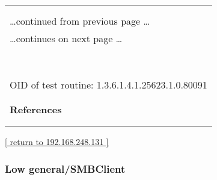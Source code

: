 \documentclass{article}
\begin{document}
\begin{longtable}{|p{}|}
\hline
\rowcolor{openvas_warning}{\color{white}{Medium (CVSS: 2.6) }}\\
\rowcolor{openvas_warning}{\color{white}{NVT: TCP timestamps}}\\
\hline
\endfirsthead
\hfill\ldots continued from previous page \ldots \\
\hline
\endhead
\hline
\ldots continues on next page \ldots \\
\endfoot
\hline
\endlastfoot
\\
\rowcolor{white}{\verb=It was detected that the host implements RFC1323.=}\\
\rowcolor{white}{\verb=The following timestamps were retrieved with a delay of 1 seconds in-between:=}\\
\rowcolor{white}{\verb=Paket 1: 831744=}\\
\rowcolor{white}{\verb=Paket 2: 831845=}\\
\rowcolor{white}{\verb==}\\
\rowcolor{white}{\verb==}\\
\\
OID of test routine: 1.3.6.1.4.1.25623.1.0.80091\\
\\

      \hline
      \\
\textbf{References}\\
\rowcolor{white}{\verb=Other:=}\\
\rowcolor{white}{\verb=  URL:http://www.ietf.org/rfc/rfc1323.txt=}\\
\end{longtable}

\begin{footnotesize}\hyperref[host:192.168.248.131]{[ return to 192.168.248.131 ]}\end{footnotesize}
\subsubsection{Low general/SMBClient}
\label{port:192.168.248.131 general/SMBClient Low}
\end{document}
